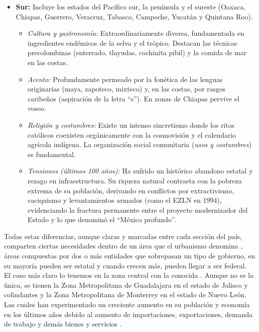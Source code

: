 \begin{itemize}
    \item \textbf{Sur:} Incluye los estados del Pacífico sur, la península y el sureste
    (Oaxaca, Chiapas, Guerrero, Veracruz, Tabasco, Campeche, Yucatán y Quintana Roo).
    \begin{itemize}
        \item \textit{Cultura y gastronomía:} Extraordinariamente diversa, fundamentada en
                ingredientes endémicos de la selva y el trópico. Destacan las técnicas
                precolombinas (enterrado, tlayudas, cochinita pibil) y la comida de mar en las costas.
        \item \textit{Acento:} Profundamente permeado por la fonética de las lenguas
                originarias (maya, zapoteco, mixteco) y, en las costas, por rasgos
                caribeños (aspiración de la letra ``s''). En zonas de Chiapas pervive el voseo.
        \item \textit{Religión y costumbres:} Existe un intenso sincretismo donde los
                ritos católicos coexisten orgánicamente con la cosmovisión y el
                calendario agrícola indígena. La organización social comunitaria
                (\textit{usos y costumbres}) es fundamental.
        \item \textit{Tensiones (últimos 100 años):} Ha sufrido un histórico abandono estatal
                y rezago en infraestructura. Su riqueza natural contrasta con la pobreza
                extrema de su población, derivando en conflictos por extractivismo,
                caciquismo y levantamientos armados (como el EZLN en 1994),
                evidenciando la fractura permanente entre el proyecto modernizador del
                Estado y lo que \cite{bonfil1987mexico} denominó el ``México profundo''.
    \end{itemize}
\end{itemize}

Todas estas diferencias, aunque claras y marcadas entre cada sección del país, comparten ciertas necesidades
dentro de un área que el urbanismo denomina , áreas compuestas por dos o más
entidades que sobrepasan un tipo de gobierno, en su mayoría pueden ser estatal y cuando crecen más, pueden llegar
a ser federal. El caso más claro lo tenemos en la zona central con la conocida \zmvm. Aunque no es la única, se tienen
la Zona Metropolitana de Guadalajara en el estado de Jalisco y colindantes y la Zona Metropolitana de Monterrey en el
estado de Nuevo León. Las cuales han experimentado un creciente aumento en su población y economía en los últimos
años debido al aumento de importaciones, exportaciones, demanda de trabajo y demás bienes y servicios
\cite{inegi_enoe_laboral}.

